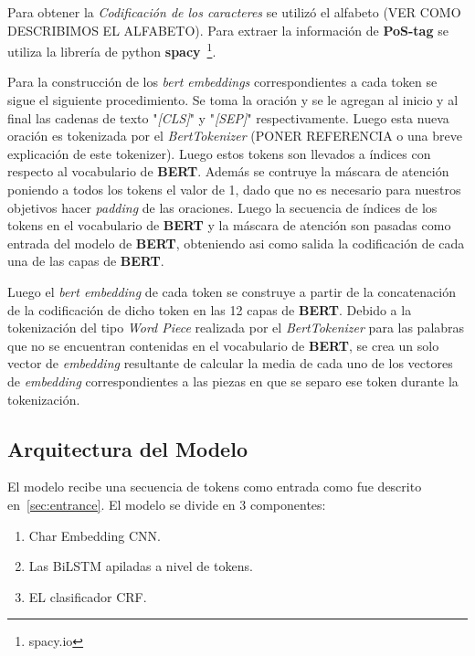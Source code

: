 Para obtener la \emph{Codificaci\'on de los caracteres} se utiliz\'o el alfabeto (VER COMO DESCRIBIMOS EL ALFABETO). Para extraer la informaci\'on de \textbf{PoS-tag} se utiliza la librer\'ia de python \textbf{spacy}~\footnote{spacy.io}. 

Para la construcci\'on de los \emph{bert embeddings} correspondientes a cada token se sigue el siguiente procedimiento. Se toma la oraci\'on y se le agregan al inicio y al final las cadenas de texto "\emph{[CLS]}" y "\emph{[SEP]}" respectivamente. Luego esta nueva oraci\'on es tokenizada por el \emph{BertTokenizer} (PONER REFERENCIA o una breve explicaci\'on de este tokenizer). Luego estos tokens son llevados a \'indices con respecto al vocabulario de \textbf{BERT}. Adem\'as se contruye la m\'ascara de atenci\'on poniendo a todos los tokens el valor de 1, dado que no es necesario para nuestros objetivos hacer \emph{padding} de las oraciones. Luego la secuencia de \'indices de los tokens en el vocabulario de \textbf{BERT} y la m\'ascara de atenci\'on son pasadas como entrada del modelo de \textbf{BERT}, obteniendo asi como salida la codificaci\'on de cada una de las capas de \textbf{BERT}.

Luego el \emph{bert embedding} de cada token se construye a partir de la concatenaci\'on de la codificaci\'on de dicho token en las 12 capas de \textbf{BERT}. Debido a la tokenizaci\'on del tipo \emph{Word Piece} realizada por el \emph{BertTokenizer} para las palabras que no se encuentran contenidas en el vocabulario de \textbf{BERT}, se crea un solo vector de \emph{embedding} resultante de calcular la media de cada uno de los vectores de \emph{embedding} correspondientes a las piezas en que se separo ese token durante la tokenizaci\'on.

\subsection{Arquitectura del Modelo}

El modelo recibe una secuencia de tokens como entrada como fue descrito en~\ref{sec:entrance}. El modelo se divide en 3 componentes: 

\begin{enumerate}
	\item Char Embedding CNN.
	\item Las BiLSTM apiladas a nivel de tokens.
	\item EL clasificador CRF. 
\end{enumerate}


